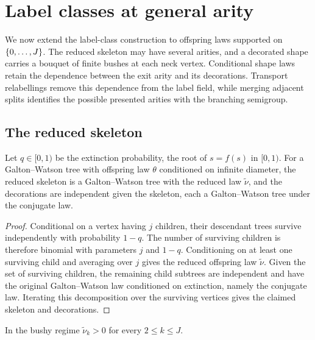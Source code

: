 \chapter{Label classes at general arity}
\label{ch:chain-general}

We now extend the label-class construction to offspring laws supported on
$\{0,\dots,J\}$. The reduced skeleton may have several arities, and a decorated shape carries
a bouquet of finite bushes at each neck vertex. Conditional shape laws retain the dependence
between the exit arity and its decorations. Transport relabellings remove this dependence from the
label field, while merging adjacent splits identifies the possible presented arities with the
branching semigroup.

\section{The reduced skeleton}

\begin{proposition}
\label{thm:harris-general}
\leanok
{}
Let $q\in[0,1)$ be the extinction probability, the root of $s=f(s)$ in $[0,1)$. For a
Galton--Watson tree with offspring law $\theta$ conditioned on infinite diameter, the reduced
skeleton is a Galton--Watson tree with the reduced law $\widetilde\nu$, and the decorations are
independent given the skeleton, each a Galton--Watson tree under the conjugate law.
\end{proposition}

\begin{proof}
\leanok
{}
Conditional on a vertex having $j$ children, their descendant trees survive independently with
probability $1-q$. The number of surviving children is therefore binomial with parameters $j$
and $1-q$. Conditioning on at least one surviving child and averaging over $j$ gives the reduced
offspring law $\widetilde\nu$. Given the set of surviving children, the remaining child subtrees
are independent and have the original Galton--Watson law conditioned on extinction, namely the
conjugate law. Iterating this decomposition over the surviving vertices gives the claimed
skeleton and decorations.
\end{proof}

\begin{corollary}
\label{thm:full-support}
\leanok
In the bushy regime $\widetilde\nu_k>0$ for every $2\leq k\leq J$.
\end{corollary}

